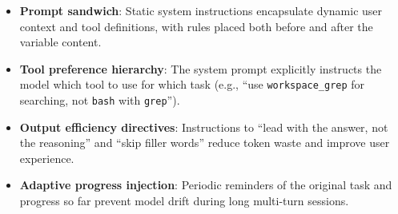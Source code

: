 \begin{itemize}[leftmargin=*]
  \item \textbf{Prompt sandwich}: Static system instructions encapsulate dynamic user context and tool definitions, with rules placed both before and after the variable content.
  \item \textbf{Tool preference hierarchy}: The system prompt explicitly instructs the model which tool to use for which task (e.g., ``use \texttt{workspace\_grep} for searching, not \texttt{bash} with \texttt{grep}'').
  \item \textbf{Output efficiency directives}: Instructions to ``lead with the answer, not the reasoning'' and ``skip filler words'' reduce token waste and improve user experience.
  \item \textbf{Adaptive progress injection}: Periodic reminders of the original task and progress so far prevent model drift during long multi-turn sessions.
\end{itemize}
